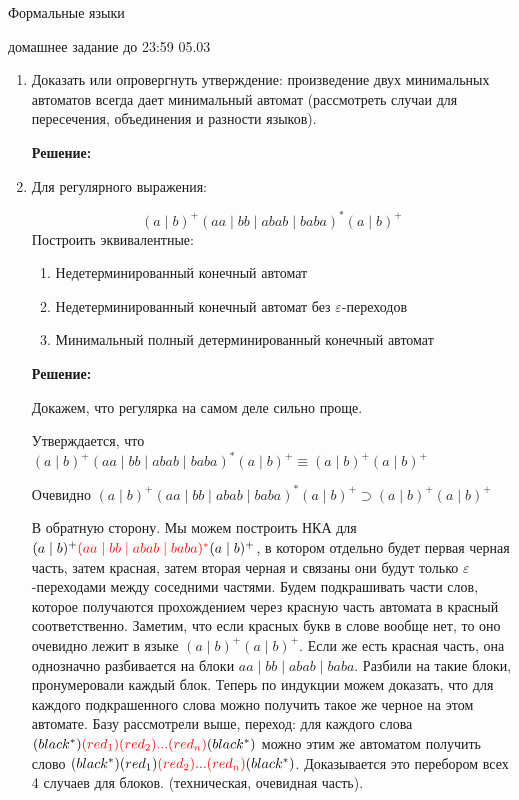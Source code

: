 \documentclass[12pt]{article}
\begin{document}
\begin{center} {\LARGE Формальные языки} \end{center}

\begin{center} \Large домашнее задание до 23:59 05.03 \end{center}
\bigskip

\begin{enumerate}
  \item Доказать или опровергнуть утверждение: произведение двух минимальных автоматов всегда дает минимальный автомат (рассмотреть случаи для пересечения, объединения и разности языков).

    {\bf Решение:} 
    


  
  \item Для регулярного выражения:
 
  \[ (a \mid b)^+ (aa \mid bb \mid abab \mid baba)^* (a \mid b)^+\]
  Построить эквивалентные:
  \begin{enumerate}
    \item Недетерминированный конечный автомат
    \item Недетерминированный конечный автомат без $\varepsilon$-переходов
    \item Минимальный полный детерминированный конечный автомат
  \end{enumerate}

  {\bf Решение:}

  Докажем, что регулярка на самом деле сильно проще. 

  Утверждается, что ${ (a \mid b)^+ (aa \mid bb \mid abab \mid baba)^* (a \mid b)^+} \equiv { (a \mid b)^+ (a \mid b)^+  }$ 

  Очевидно ${ (a \mid b)^+ (aa \mid bb \mid abab \mid baba)^* (a \mid b)^+} \supset { (a \mid b)^+ (a \mid b)^+  }$ 

  В обратную сторону. Мы можем построить НКА для ${ (a \mid b)^+ \textcolor{red}{(aa \mid bb \mid abab \mid baba)^*} (a \mid b)^+}$, в котором
  отдельно будет первая черная часть, затем красная, затем вторая черная и связаны они будут только $\varepsilon$-переходами между соседними частями.
  Будем подкрашивать части слов, которое получаются прохождением через красную часть автомата в красный соответственно. Заметим, что если красных букв в слове вообще нет, то
  оно очевидно лежит в языке  ${ (a \mid b)^+ (a \mid b)^+  }$. Если же есть красная часть, она однозначно разбивается на блоки $aa \mid bb \mid abab \mid baba$. Разбили на такие блоки, 
  пронумеровали каждый блок. Теперь по индукции можем доказать, что для каждого подкрашенного слова можно получить такое же черное на этом автомате. Базу рассмотрели выше, переход: для каждого слова  $(black^*) \textcolor{red}{(red_{1})(red_{2}) ... (red_{n})}(black^*)$ можно этим же автоматом 
  получить слово $(black^*)(red_{1}) \textcolor{red}{(red_{2})...(red_{n})} (black^*)$. Доказывается это перебором всех 4 случаев для блоков. (техническая, очевидная часть). 


\end{enumerate}
\end{document}
